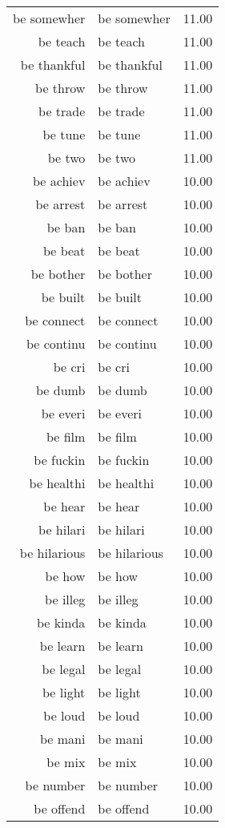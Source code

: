 \begin{table}[ht]
\begin{tabular}{rlr}
  be somewher & be somewher & 11.00 \\ 
  be teach & be teach & 11.00 \\ 
  be thankful & be thankful & 11.00 \\ 
  be throw & be throw & 11.00 \\ 
  be trade & be trade & 11.00 \\ 
  be tune & be tune & 11.00 \\ 
  be two & be two & 11.00 \\ 
  be achiev & be achiev & 10.00 \\ 
  be arrest & be arrest & 10.00 \\ 
  be ban & be ban & 10.00 \\ 
  be beat & be beat & 10.00 \\ 
  be bother & be bother & 10.00 \\ 
  be built & be built & 10.00 \\ 
  be connect & be connect & 10.00 \\ 
  be continu & be continu & 10.00 \\ 
  be cri & be cri & 10.00 \\ 
  be dumb & be dumb & 10.00 \\ 
  be everi & be everi & 10.00 \\ 
  be film & be film & 10.00 \\ 
  be fuckin & be fuckin & 10.00 \\ 
  be healthi & be healthi & 10.00 \\ 
  be hear & be hear & 10.00 \\ 
  be hilari & be hilari & 10.00 \\ 
  be hilarious & be hilarious & 10.00 \\ 
  be how & be how & 10.00 \\ 
  be illeg & be illeg & 10.00 \\ 
  be kinda & be kinda & 10.00 \\ 
  be learn & be learn & 10.00 \\ 
  be legal & be legal & 10.00 \\ 
  be light & be light & 10.00 \\ 
  be loud & be loud & 10.00 \\ 
  be mani & be mani & 10.00 \\ 
  be mix & be mix & 10.00 \\ 
  be number & be number & 10.00 \\ 
  be offend & be offend & 10.00 \\ 

\end{tabular}
\end{table}
